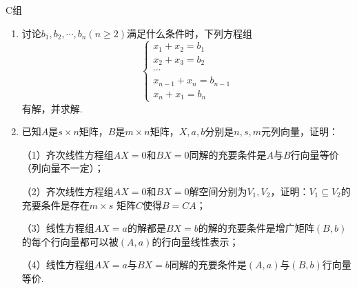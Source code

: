 \centerline{\heiti C组}
\begin{enumerate}
	\item 讨论$b_1,b_2,\cdots,b_n(n\ge 2)$满足什么条件时，下列方程组$$\begin{cases}
		x_1+x_2=b_1 \\ x_2+x_3=b_2 \\ \cdots \\ x_{n-1}+x_n=b_{n-1} \\ x_n+x_1=b_n
	\end{cases}$$有解，并求解.
	\item 已知$A$是$s \times n$矩阵，$B$是$m \times n$矩阵，$X,a,b$分别是$n,s,m$元列向量，证明：
	
	（1）齐次线性方程组$AX=0$和$BX=0$同解的充要条件是$A$与$B$行向量等价（列向量不一定）；

	（2）齐次线性方程组$AX=0$和$BX=0$解空间分别为$V_1,V_2$，证明：$V_1 \subseteq V_2$的充要条件是存在$m \times s$
	矩阵$C$使得$B=CA$；

	（3）线性方程组$AX=a$的解都是$BX=b$的解的充要条件是增广矩阵$(B,b)$的每个行向量都可以被$(A,a)$的行向量线性表示；

	（4）线性方程组$AX=a$与$BX=b$同解的充要条件是$(A,a)$与$(B,b)$行向量等价.
\end{enumerate}